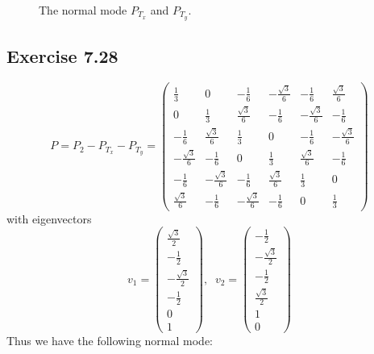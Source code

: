 \documentclass[]{ctexart}
\begin{document}
\begin{figure}[h]
	\caption{The normal mode $P_{T_x}$ and $P_{T_y}$. }
\end{figure}

\subsection{Exercise 7.28}
\begin{equation*}
P=P_2-P_{T_x}-P_{T_y}=\begin{pmatrix}
\frac{1}{3} & 0 & -\frac{1}{6} & -\frac{\sqrt{3}}{6} & -\frac{1}{6} & \frac{\sqrt{3}}{6}\\
0 & \frac{1}{3} & \frac{\sqrt{3}}{6} & -\frac{1}{6} & -\frac{\sqrt{3}}{6} & -\frac{1}{6}\\
-\frac{1}{6} & \frac{\sqrt{3}}{6} & \frac{1}{3} & 0 & -\frac{1}{6} & -\frac{\sqrt{3}}{6}\\
-\frac{\sqrt{3}}{6} & -\frac{1}{6} & 0 & \frac{1}{3} & \frac{\sqrt{3}}{6} & -\frac{1}{6}\\
-\frac{1}{6} & -\frac{\sqrt{3}}{6} & -\frac{1}{6} & \frac{\sqrt{3}}{6} & \frac{1}{3} & 0\\
\frac{\sqrt{3}}{6} & -\frac{1}{6} & -\frac{\sqrt{3}}{6} & -\frac{1}{6} & 0 & \frac{1}{3}
\end{pmatrix}
\end{equation*}
with eigenvectors 
\begin{equation*}
v_1=\begin{pmatrix}
\frac{\sqrt{3}}{2} \\ -\frac{1}{2} \\ -\frac{\sqrt{3}}{2} \\ -\frac{1}{2} \\ 0 \\ 1
\end{pmatrix},\;\;v_2=\begin{pmatrix}
-\frac{1}{2} \\ -\frac{\sqrt{3}}{2} \\ -\frac{1}{2} \\\frac{\sqrt{3}}{2} \\ 1\\ 0
\end{pmatrix}
\end{equation*}
Thus we have the following normal mode: 
\end{document}
